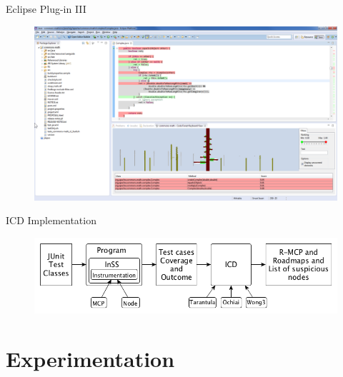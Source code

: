 \documentclass[handout]{beamer}
\begin{document}
\begin{frame}{Eclipse Plug-in III}
    \begin{figure}
        \centering
        \includegraphics[width=\linewidth]{../figures/commons_math_complex_05_view_min}
    \end{figure}
\end{frame}

\begin{frame}{ICD Implementation}
    \begin{figure}
        \centering
        \includegraphics[width=\textwidth]{../figures/icd_implementation}
    \end{figure}
\end{frame}

\section{Experimentation}

\begin{frame}
    \sectionpage
\end{frame}
\end{document}
